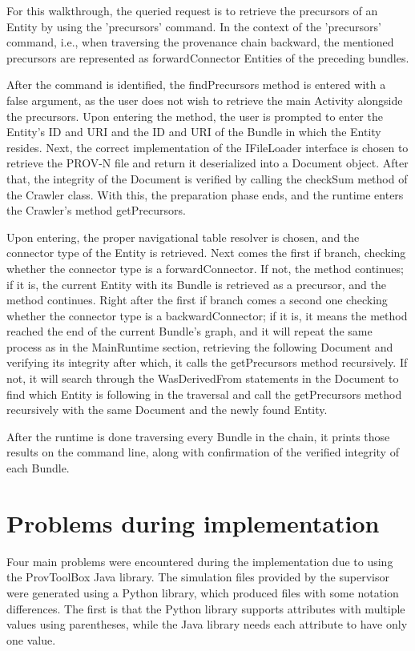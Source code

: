 \documentclass[
  digital,     %
  oneside,     %
  nosansbold,  %
  nocolorbold, %
  lof,         %
  lot,         %
]{fithesis4}
\begin{document}
For this walkthrough, the queried request is to retrieve the precursors of an Entity by using the 'precursors' command. In the context of the 'precursors' command, i.e., when traversing the provenance chain backward, the mentioned precursors are represented as forwardConnector Entities of the preceding bundles.

After the command is identified, the findPrecursors method is entered with a false argument, as the user does not wish to retrieve the main Activity alongside the precursors. Upon entering the method, the user is prompted to enter the Entity's ID and URI and the ID and URI of the Bundle in which the Entity resides. Next, the correct implementation of the IFileLoader interface is chosen to retrieve the PROV-N file and return it deserialized into a Document object. After that, the integrity of the Document is verified by calling the checkSum method of the Crawler class. With this, the preparation phase ends, and the runtime enters the Crawler's method getPrecursors.

Upon entering, the proper navigational table resolver is chosen, and the connector type of the Entity is retrieved. Next comes the first if branch, checking whether the connector type is a forwardConnector. If not, the method continues; if it is, the current Entity with its Bundle is retrieved as a precursor, and the method continues. Right after the first if branch comes a second one checking whether the connector type is a backwardConnector; if it is, it means the method reached the end of the current Bundle's graph, and it will repeat the same process as in the MainRuntime section, retrieving the following Document and verifying its integrity after which, it calls the getPrecursors method recursively. If not, it will search through the WasDerivedFrom statements in the Document to find which Entity is following in the traversal and call the getPrecursors method recursively with the same Document and the newly found Entity. 

After the runtime is done traversing every Bundle in the chain, it prints those results on the command line, along with confirmation of the verified integrity of each Bundle.

\section{Problems during implementation}
Four main problems were encountered during the implementation due to using the ProvToolBox Java library. The simulation files provided by the supervisor were generated using a Python library, which produced files with some notation differences. The first is that the Python library supports attributes with multiple values using parentheses, while the Java library needs each attribute to have only one value.
\end{document}
